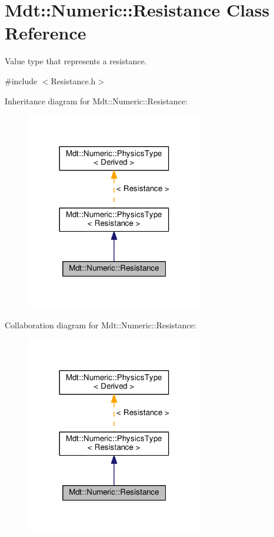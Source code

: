 \hypertarget{class_mdt_1_1_numeric_1_1_resistance}{}\section{Mdt\+:\+:Numeric\+:\+:Resistance Class Reference}
\label{class_mdt_1_1_numeric_1_1_resistance}


Value type that represents a resistance.  




{\ttfamily \#include $<$Resistance.\+h$>$}



Inheritance diagram for Mdt\+:\+:Numeric\+:\+:Resistance\+:\nopagebreak
\begin{figure}[H]
\begin{center}
\leavevmode
\includegraphics[width=221pt]{class_mdt_1_1_numeric_1_1_resistance__inherit__graph}
\end{center}
\end{figure}


Collaboration diagram for Mdt\+:\+:Numeric\+:\+:Resistance\+:\nopagebreak
\begin{figure}[H]
\begin{center}
\leavevmode
\includegraphics[width=221pt]{class_mdt_1_1_numeric_1_1_resistance__coll__graph}
\end{center}
\end{figure}

